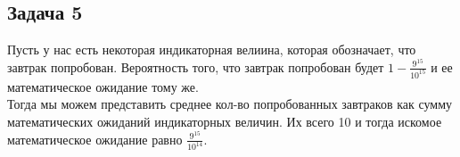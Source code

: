 	\subsection{Задача 5}
	Пусть у нас есть некоторая индикаторная велиина, которая обозначает, что завтрак попробован. Вероятность того, что завтрак попробован будет $1 - \frac{9^{15}}{10^{15}}$ и ее математическое ожидание тому же. \\
	Тогда мы можем представить среднее кол-во попробованных завтраков как сумму математических ожиданий индикаторных величин. Их всего 10 и тогда искомое математическое ожидание равно $\frac{9^{15}}{10^{14}}$.
		
